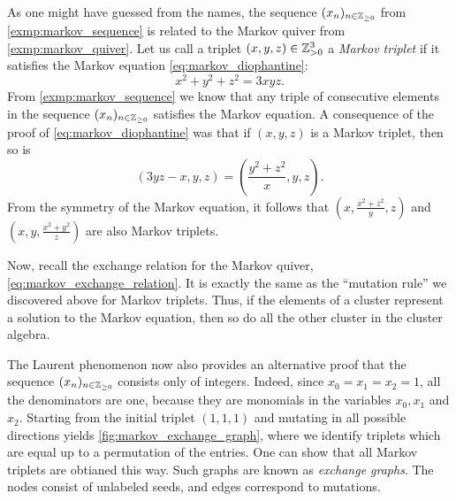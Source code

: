 \begin{example}

	As one might have guessed from the names, the sequence $(x_n)_{n \in \mathbb{Z}_{\geq 0}}$
	from \cref{exmp:markov_sequence} is related to the Markov quiver from
	\cref{exmp:markov_quiver}. Let us call a triplet $(x,y,z) \in
		\mathbb{Z}_{> 0}^3$ a \emph{Markov triplet} if it satisfies the Markov
	equation \cref{eq:markov_diophantine}:
	\begin{equation*}
		x^2 + y^2 + z^2 = 3 x y z.
	\end{equation*}
	From \cref{exmp:markov_sequence} we know that any triple of consecutive elements in the
	sequence $(x_n)_{n \in \mathbb{Z}_{\geq 0}}$ satisfies the Markov equation. A consequence of
	the proof of \cref{eq:markov_diophantine} was that if $(x,y,z)$ is a Markov triplet,
	then so is
	\begin{equation*}
		(3 yz -x, y, z) = (\frac{y^2 + z^2}{x}, y, z).
	\end{equation*}
	From the symmetry of the Markov equation, it follows that $(x, \frac{x^2 + z^2}{y}, z)$
	and $(x, y, \frac{x^2 + y^2}{z})$ are also Markov triplets.

	Now, recall the exchange relation for the Markov quiver,
	\cref{eq:markov_exchange_relation}. It is exactly the same as the ``mutation rule'' we
	discovered above for Markov triplets. Thus, if the elements of a cluster represent a
	solution to the Markov equation, then so do all the other cluster in the cluster
	algebra.

	The Laurent phenomenon now also provides an alternative proof that the sequence
	$(x_n)_{n\in \mathbb{Z}_{\geq 0}}$ consists only of integers. Indeed, since $x_0 = x_1 = x_2
		= 1$, all the denominators are one, because they are monomials in the variables $x_0,
		x_1$ and $x_2$. Starting from the initial triplet $(1,1,1)$ and mutating in all
	possible directions yields \cref{fig:markov_exchange_graph}, where we identify triplets
	which are equal up to a permutation of the entries. One can show that all Markov
	triplets are obtianed this way. Such graphs are known as \emph{exchange
		graphs}. The nodes consist of unlabeled seeds, and edges
	correspond to mutations.


\end{example}
